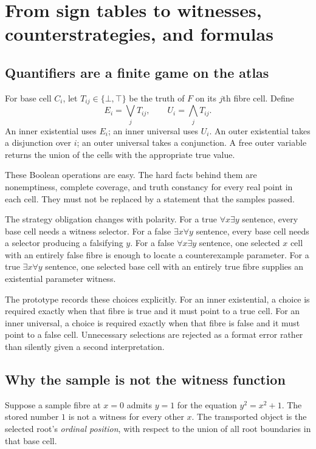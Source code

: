 \section{From sign tables to witnesses, counterstrategies, and formulas}
\label{sec:strategies}
\subsection{Quantifiers are a finite game on the atlas}
For base cell $C_i$, let $T_{ij}\in\{\bot,\top\}$ be the truth of $F$ on its $j$th fibre cell. Define
\[
 E_i=\bigvee_jT_{ij},\qquad U_i=\bigwedge_jT_{ij}.
\]
An inner existential uses $E_i$; an inner universal uses $U_i$. An outer existential takes a disjunction over $i$; an outer universal takes a conjunction. A free outer variable returns the union of the cells with the appropriate true value.

These Boolean operations are easy. The hard facts behind them are nonemptiness, complete coverage, and truth constancy for every real point in each cell. They must not be replaced by a statement that the samples passed.

The strategy obligation changes with polarity. For a true $\forall x\exists y$ sentence, every base cell needs a witness selector. For a false $\exists x\forall y$ sentence, every base cell needs a selector producing a falsifying $y$. For a false $\forall x\exists y$ sentence, one selected $x$ cell with an entirely false fibre is enough to locate a counterexample parameter. For a true $\exists x\forall y$ sentence, one selected base cell with an entirely true fibre supplies an existential parameter witness.

The prototype records these choices explicitly. For an inner existential, a choice is required exactly when that fibre is true and it must point to a true cell. For an inner universal, a choice is required exactly when that fibre is false and it must point to a false cell. Unnecessary selections are rejected as a format error rather than silently given a second interpretation.

\subsection{Why the sample is not the witness function}
Suppose a sample fibre at $x=0$ admits $y=1$ for the equation $y^2=x^2+1$. The stored number $1$ is not a witness for every other $x$. The transported object is the selected root's \emph{ordinal position}, with respect to the union of all root boundaries in that base cell.

